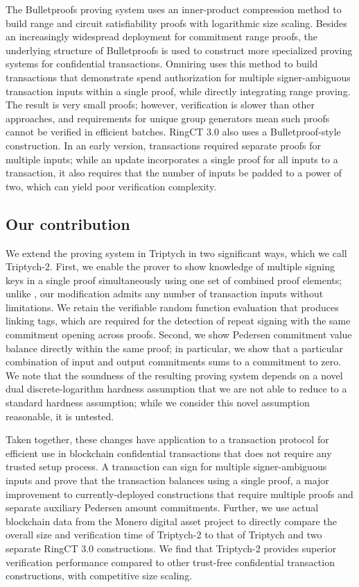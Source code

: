 \documentclass{article}
\theoremstyle{definition}
\begin{document}
The Bulletproofs \cite{bulletproofs} proving system uses an inner-product compression method to build range and circuit satisfiability proofs with logarithmic size scaling.
Besides an increasingly widespread deployment for commitment range proofs, the underlying structure of Bulletproofs is used to construct more specialized proving systems for confidential transactions.
Omniring \cite{omniring} uses this method to build transactions that demonstrate spend authorization for multiple signer-ambiguous transaction inputs within a single proof, while directly integrating range proving.
The result is very small proofs; however, verification is slower than other approaches, and requirements for unique group generators mean such proofs cannot be verified in efficient batches.
RingCT 3.0 \cite{rct3} also uses a Bulletproof-style construction.
In an early version, transactions required separate proofs for multiple inputs; while an update incorporates a single proof for all inputs to a transaction, it also requires that the number of inputs be padded to a power of two, which can yield poor verification complexity.


\subsection{Our contribution}
We extend the proving system in Triptych \cite{triptych} in two significant ways, which we call Triptych-2.
First, we enable the prover to show knowledge of multiple signing keys in a single proof simultaneously using one set of combined proof elements; unlike \cite{rct3}, our modification admits any number of transaction inputs without limitations.
We retain the verifiable random function evaluation that produces linking tags, which are required for the detection of repeat signing with the same commitment opening across proofs.
Second, we show Pedersen commitment value balance directly within the same proof; in particular, we show that a particular combination of input and output commitments sums to a commitment to zero.
We note that the soundness of the resulting proving system depends on a novel dual discrete-logarithm hardness assumption that we are not able to reduce to a standard hardness assumption; while we consider this novel assumption reasonable, it is untested.

Taken together, these changes have application to a transaction protocol for efficient use in blockchain confidential transactions that does not require any trusted setup process.
A transaction can sign for multiple signer-ambiguous inputs and prove that the transaction balances using a single proof, a major improvement to currently-deployed constructions that require multiple proofs and separate auxiliary Pedersen amount commitments.
Further, we use actual blockchain data from the Monero digital asset project to directly compare the overall size and verification time of Triptych-2 to that of Triptych and two separate RingCT 3.0 constructions.
We find that Triptych-2 provides superior verification performance compared to other trust-free confidential transaction constructions, with competitive size scaling.
\end{document}
